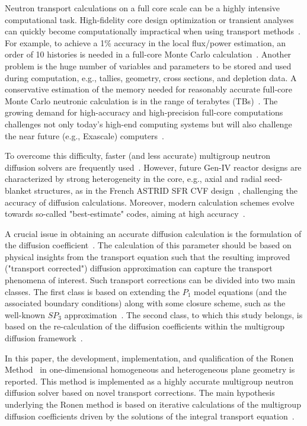 Neutron transport calculations on a full core scale can be a highly intensive computational task. High-fidelity core design optimization or transient analyses can quickly become computationally impractical when using transport methods~\cite{Kim-2019}. For example, to achieve a 1\% accuracy in the local flux/power estimation, an order of 10 histories is needed in a full-core Monte Carlo calculation~\cite{Martin-2012}. Another problem is the huge number of variables and parameters to be stored and used during computation, e.g., tallies, geometry, cross sections, and depletion data. A conservative estimation of the memory needed for reasonably accurate full-core Monte Carlo neutronic calculation is in the range of terabytes (TBs)~\cite{Martin-2012}. The growing demand for high-accuracy and high-precision full-core computations challenges not only today’s high-end computing systems but will also challenge the near future (e.g., Exascale) computers~\cite{Martin-2012,Smith-2011,Kim-2019}.  

To overcome this difficulty, faster (and less accurate) multigroup neutron diffusion solvers are frequently used~\cite{Lawrence-1986,Smith-1986}. However, future Gen-IV reactor designs are characterized by strong heterogeneity in the core, e.g., axial and radial seed-blanket structures, as in the French ASTRID SFR CVF design~\cite{Bertrand-2016}, challenging the accuracy of diffusion calculations. Moreover, modern calculation schemes evolve towards so-called "best-estimate" codes, aiming at high accuracy~\cite{IAEA-BE-2008}. 

A crucial issue in obtaining an accurate diffusion calculation is the formulation of the diffusion coefficient~\cite{Bell-1970,Pounders-2009}. The calculation of this parameter should be based on physical insights from the transport equation such that the resulting improved ("transport corrected") diffusion approximation can capture the transport phenomena of interest. Such transport corrections can be divided into two main classes. The first class is based on extending the $P_1$ model equations (and the associated boundary conditions) along with some closure scheme, such as the well-known $SP_3$ approximation~\cite{Brantley-2000}. The second class, to which this study belongs, is based on the re-calculation of the diffusion coefficients within the multigroup diffusion framework~\cite{Tomatis-2011}. 

In this paper, the development, implementation, and qualification of the Ronen Method~\cite{Ronen-2004} in one-dimensional homogeneous and heterogeneous plane geometry is reported. This method is implemented as a highly accurate multigroup neutron diffusion solver based on novel transport corrections. The main hypothesis underlying the Ronen method is based on iterative calculations of the multigroup diffusion coefficients driven by the solutions of the integral transport equation~\cite{Ronen-2004,Tomatis-2011}. 

